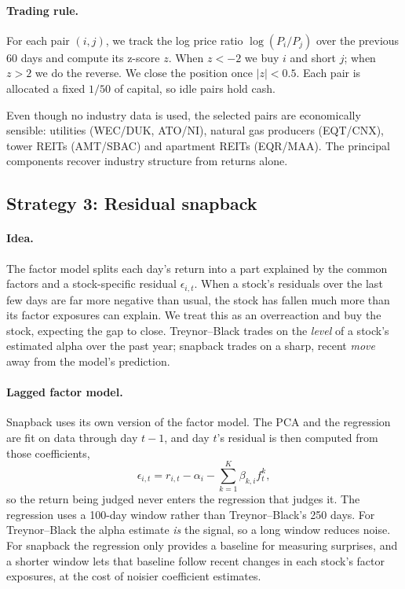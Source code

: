\documentclass[12pt,letterpaper]{article}
\begin{document}
\paragraph{Trading rule.} For each pair $(i, j)$, we track the log price ratio $\log(P_i / P_j)$ over the previous 60 days and compute its z-score $z$. When $z < -2$ we buy $i$ and short $j$; when $z > 2$ we do the reverse. We close the position once $|z| < 0.5$. Each pair is allocated a fixed $1/50$ of capital, so idle pairs hold cash.

Even though no industry data is used, the selected pairs are economically sensible: utilities (WEC/DUK, ATO/NI), natural gas producers (EQT/CNX), tower REITs (AMT/SBAC) and apartment REITs (EQR/MAA). The principal components recover industry structure from returns alone.

\subsection{Strategy 3: Residual snapback}
\label{sec:snapback}

\paragraph{Idea.} The factor model splits each day's return into a part explained by the common factors and a stock-specific residual $\epsilon_{i,t}$. When a stock's residuals over the last few days are far more negative than usual, the stock has fallen much more than its factor exposures can explain. We treat this as an overreaction and buy the stock, expecting the gap to close. Treynor--Black trades on the \emph{level} of a stock's estimated alpha over the past year; snapback trades on a sharp, recent \emph{move} away from the model's prediction.

\paragraph{Lagged factor model.} Snapback uses its own version of the factor model. The PCA and the regression are fit on data through day $t-1$, and day $t$'s residual is then computed from those coefficients,
\[
    \epsilon_{i,t} = r_{i,t} - \alpha_i - \sum_{k=1}^{K} \beta_{k,i} f^k_t ,
\]
so the return being judged never enters the regression that judges it. The regression uses a 100-day window rather than Treynor--Black's 250 days. For Treynor--Black the alpha estimate \emph{is} the signal, so a long window reduces noise. For snapback the regression only provides a baseline for measuring surprises, and a shorter window lets that baseline follow recent changes in each stock's factor exposures, at the cost of noisier coefficient estimates.
\end{document}
